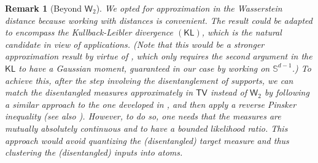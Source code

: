 \documentclass[a4paper,11pt]{article}
\theoremstyle{plain}
\newtheorem{remark}[theorem]{Remark}
\newcommand{\diff}{\, \mathrm{d}}
\renewcommand{\S}{\mathbb{S}^{d-1}}
\renewcommand{\geq}{\geqslant}
\numberwithin{equation}{section}
\newcommand{\nddrb}[1]{ {\text{{\bf drb:}} \color{magenta}{#1} } }
\newcommand{\ndpr}[1]{ {\colorbox{MIT}{\color{white} \textsf{PR}} \color{MIT}{#1}} }
\newcommand{\npdr}[1]{ {\colorbox{MIT}{\color{white} \textsf{PR}} \color{MIT}{#1}} }
\begin{document}
\begin{remark}[Beyond $\mathsf{W}_2$] We opted for approximation in the Wasserstein distance because working with distances is convenient. The result could be adapted to encompass the Kullback-Leibler divergence  $(\mathsf{KL})$, which is the natural candidate in view of applications.
(Note that this would be a stronger approximation result by virtue of \cite{bolley2005weighted}, which only requires the second argument in the $\mathsf{KL}$ to have a Gaussian moment, guaranteed in our case by working on $\S$.)
To achieve this, after the step involving the disentanglement of supports, we can match the disentangled measures approximately in $\mathsf{TV}$ instead of $\mathsf{W}_2$ by following a similar approach to the one developed in \cite{ruiz2024control}, and then apply a reverse Pinsker inequality \cite[Theorem 7]{verdu2014total} (see also \cite{sason2016f}). However, to do so, one needs that the measures are mutually absolutely continuous and to have a bounded likelihood ratio. %
This approach would avoid quantizing the (disentangled) target measure and thus clustering the (disentangled) inputs into atoms.
\end{remark}
\end{document}
